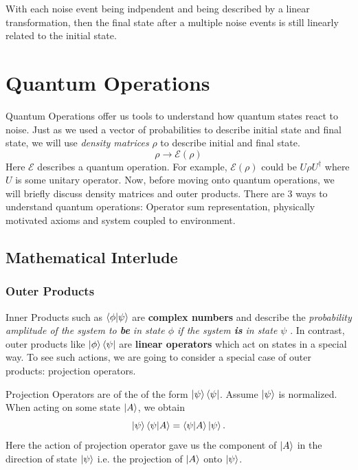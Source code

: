 \documentclass{article}
\begin{document}
With each noise event being indpendent and being described by a linear transformation,
then the final state after a multiple
noise events is still linearly related to
the initial state.

\section{Quantum Operations}
Quantum Operations offer us tools to understand how quantum states
react to noise. Just as we used a vector of probabilities to
describe initial state and final state, we will use \textit{density
matrices} \(\rho\) to describe initial and final state.
\[\rho \longrightarrow \mathcal{E}(\rho)\]
Here \(\mathcal{E}\) describes a quantum operation. For example, \(\mathcal{E}(\rho)\) could be \(U\rho U^{\dagger}\) where \(U\) is
some unitary operator. Now, before moving onto quantum operations, we
will briefly discuss density matrices and outer products.
There are 3 ways to understand quantum operations: Operator sum representation, physically
motivated axioms and system coupled to environment.
\subsection{Mathematical Interlude}
\subsubsection{Outer Products}
Inner Products such as \(\bra{\phi}\ket{\psi}\) are \textbf{complex numbers}
and describe the \textit{probability amplitude of
the system to \textbf{be} in state \(\phi\) if the system \textbf{is} in
state \(\psi\) }. In contrast, outer products like
\(\ket{\phi}\bra{\psi}\) are \textbf{linear operators} which act on states in a special way. To see such actions, we are going to consider a special case
of outer products: projection operators.

Projection Operators are of the of the form \(\ket{\psi}\bra{\psi}\).
Assume \(\ket{\psi}\) is normalized. When acting on some state \(\ket{A}\), we obtain
\[\ket{\psi}\bra{\psi}   \ket{A} =\bra{\psi}\ket{A}\ket{\psi}.\]
Here the action of projection operator gave us the component of \(\ket{A}\) in the direction of state \(\ket{\psi}\) i.e. the projection of \(\ket{A}\) onto \(\ket{\psi}\).
\end{document}
